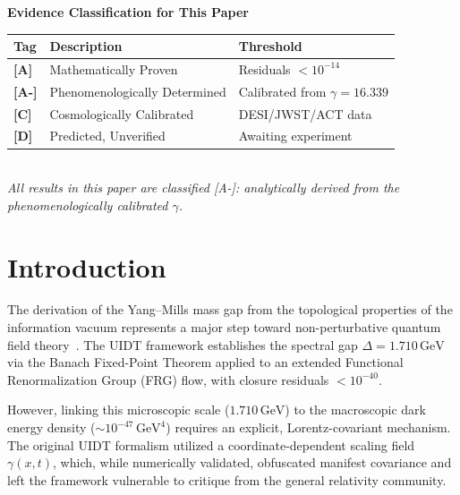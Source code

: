\documentclass[12pt,a4paper,twoside]{article}
\theoremstyle{plain}
\theoremstyle{definition}
\theoremstyle{remark}
\newcommand{\UIDT}{\textsc{UIDT}}
\newcommand{\GeV}{\,\mathrm{GeV}}
\begin{document}
\vspace{1em}
\begin{center}
\begin{tcolorbox}[
    enhanced,
    colback=gray!4,
    frame hidden,
    boxrule=0pt,
    arc=2pt,
    drop shadow,
    width=0.95\textwidth,
    top=10pt, bottom=10pt, left=12pt, right=12pt
]
\centering
{\small\sffamily\bfseries Evidence Classification for This Paper}\\[6pt]
\begin{tabular}{@{} >{\bfseries}l l l @{}}
\toprule
Tag & Description & Threshold \\
\midrule
\textcolor{catA}{[A]} & Mathematically Proven & Residuals $< 10^{-14}$ \\
\textcolor{catAminus}{[A-]} & Phenomenologically Determined & Calibrated from $\gamma = 16.339$ \\
\textcolor{catC}{[C]} & Cosmologically Calibrated & DESI/JWST/ACT data \\
\textcolor{catD}{[D]} & Predicted, Unverified & Awaiting experiment \\
\bottomrule
\end{tabular}\\[6pt]
{\footnotesize\itshape All results in this paper are classified \textcolor{catAminus}{[A-]}:
analytically derived from the phenomenologically calibrated $\gamma$.}
\end{tcolorbox}
\end{center}

\clearpage
\tableofcontents
\clearpage
\pagestyle{csfpaper}


\section{Introduction}
\label{sec:intro}

The derivation of the Yang--Mills mass gap from the topological properties of
the information vacuum represents a major step toward non-perturbative quantum
field theory~\cite{Rietz2026}. The \UIDT{} framework establishes the spectral gap
$\Delta = 1.710\GeV$ via the Banach Fixed-Point Theorem applied to an extended
Functional Renormalization Group (FRG) flow, with closure residuals
$< 10^{-40}$.

However, linking this microscopic scale ($1.710\GeV$) to the macroscopic dark
energy density ($\sim 10^{-47}\GeV^4$) requires an explicit, Lorentz-covariant
mechanism. The original \UIDT{} formalism utilized a coordinate-dependent
scaling field $\gamma(x,t)$, which, while numerically validated, obfuscated
manifest covariance and left the framework vulnerable to critique from the
general relativity community.
\end{document}
